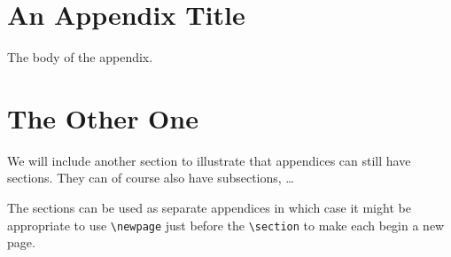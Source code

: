 \section{An Appendix Title}
The body of the appendix.
\section{The Other One}
We will include another section to illustrate that appendices can still
have sections.  They can of course also have subsections, \dots

The sections can be used as separate appendices in which case it
might be appropriate to use \verb|\newpage| just before the
\verb|\section| to make each begin a new page.
\tableofcontents
\coversheet

%
%
